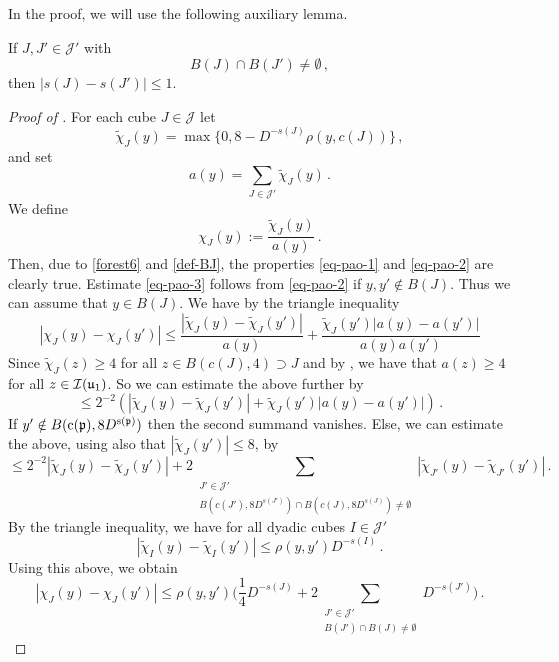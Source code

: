     In the proof, we will use the following auxiliary lemma.

    \begin{lemma}
        \label{moderate-scale-change}
        \leanok

        If $J, J' \in \mathcal{J'}$ with
        $$
            B(J) \cap B(J') \ne \emptyset\,,
        $$
        then $|s(J) - s(J')| \le 1$.
    \end{lemma}

    \begin{proof}[Proof of ]
        For each cube $J \in \mathcal{J}$ let
        $$
            \tilde\chi_J(y) = \max\{0, 8 - D^{-s(J)} \rho(y, c(J))\}\,,
        $$
        and set
        $$
            a(y) = \sum_{J \in \mathcal{J}'} \tilde \chi_J(y)\,.
        $$
        We define
        \[
            \chi_J(y) := \frac{\tilde \chi_J(y)}{a(y)}\,.
        \]
        Then, due to \eqref{forest6} and \eqref{def-BJ}, the properties \eqref{eq-pao-1} and \eqref{eq-pao-2} are clearly true. Estimate \eqref{eq-pao-3} follows from \eqref{eq-pao-2} if $y, y' \notin B(J)$. Thus we can assume that $y \in B(J)$. We have by the triangle inequality
        $$
            |\chi_J(y) - \chi_J(y')| \le \frac{|\tilde \chi_J(y) - \tilde \chi_J(y')|}{a(y)} + \frac{\tilde \chi_J(y')|a(y) - a(y')|}{a(y)a(y')}
        $$
        Since $\tilde \chi_J(z) \ge 4$ for all $z \in B(c(J), 4) \supset J$ and by , we have that $a(z) \ge 4$ for all $z \in {\mathcal{I}}({\mathfrak u}_1)$. So we can estimate the above further by
        $$
            \le 2^{-2}(|\tilde \chi_J(y) - \tilde \chi_J(y')| + \tilde \chi_J(y')|a(y) - a(y')|)\,.
        $$
        If $y' \notin B({\mathrm{c}}({\mathfrak p}), 8D^{{\mathrm{s}}({\mathfrak p})})$ then the second summand vanishes. Else, we can estimate the above, using also that $|\tilde \chi_J(y')| \le 8$, by
        $$
            \le 2^{-2} |\tilde \chi_J(y) - \tilde \chi_J(y')| + 2 \sum_{\substack{J' \in \mathcal{J}'\\ B(c(J'), 8D^{s(J')}) \cap B(c(J), 8D^{s(J)}) \ne \emptyset}}|\tilde \chi_{J'}(y) - \tilde \chi_{J'} (y')|\,.
        $$
        By the triangle inequality, we have for all dyadic cubes $I \in \mathcal{J}'$
        $$
            |\tilde \chi_I(y) - \tilde \chi_I(y')| \le \rho(y, y') D^{-s(I)}\,.
        $$
        Using this above, we obtain
        $$
            |\chi_J(y) - \chi_J(y')| \le \rho(y,y') \Big( \frac{1}{4} D^{-s(J)} + 2 \sum_{\substack{J' \in \mathcal{J}'\\ B(J') \cap B(J) \ne \emptyset}} D^{-s(J')}\Big)\,.
$$
\end{proof}
